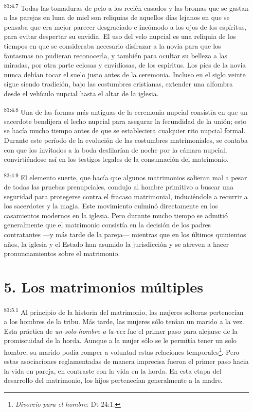 \documentclass[twoside, 11pt]{book}
\begin{document}
\par
\textsuperscript{83:4.7} Todas las tomaduras de pelo a los recién casados y las bromas que se gastan a las parejas en luna de miel son reliquias de aquellos días lejanos en que se pensaba que era mejor parecer desgraciado e incómodo a los ojos de los espíritus, para evitar despertar su envidia. El uso del velo nupcial es una reliquia de los tiempos en que se consideraba necesario disfrazar a la novia para que los fantasmas no pudieran reconocerla, y también para ocultar su belleza a las miradas, por otra parte celosas y envidiosas, de los espíritus. Los pies de la novia nunca debían tocar el suelo justo antes de la ceremonia. Incluso en el siglo veinte sigue siendo tradición, bajo las costumbres cristianas, extender una alfombra desde el vehículo nupcial hasta el altar de la iglesia.

\par
\textsuperscript{83:4.8} Una de las formas más antiguas de la ceremonia nupcial consistía en que un sacerdote bendijera el lecho nupcial para asegurar la fecundidad de la unión; esto se hacía mucho tiempo antes de que se estableciera cualquier rito nupcial formal. Durante este período de la evolución de las costumbres matrimoniales, se contaba con que los invitados a la boda desfilarían de noche por la cámara nupcial, convirtiéndose así en los testigos legales de la consumación del matrimonio.

\par
\textsuperscript{83:4.9} El elemento suerte, que hacía que algunos matrimonios salieran mal a pesar de todas las pruebas prenupciales, condujo al hombre primitivo a buscar una seguridad para protegerse contra el fracaso matrimonial, induciéndole a recurrir a los sacerdotes y la magia. Este movimiento culminó directamente en los casamientos modernos en la iglesia. Pero durante mucho tiempo se admitió generalmente que el matrimonio consistía en la decisión de los padres contratantes ---y más tarde de la pareja--- mientras que en los últimos quinientos años, la iglesia y el Estado han asumido la jurisdicción y se atreven a hacer pronunciamientos sobre el matrimonio.

\section*{5. Los matrimonios múltiples}
\par
\textsuperscript{83:5.1} Al principio de la historia del matrimonio, las mujeres solteras pertenecían a los hombres de la tribu. Más tarde, las mujeres sólo tenían un marido a la vez. Esta práctica de \textit{un-solo-hombre-a-la-vez} fue el primer paso para alejarse de la promiscuidad de la horda. Aunque a la mujer sólo se le permitía tener un solo hombre, su marido podía romper a voluntad estas relaciones temporales\footnote{\textit{Divorcio para el hombre}: Dt 24:1.}. Pero estas asociaciones reglamentadas de manera imprecisa fueron el primer paso hacia la vida en pareja, en contraste con la vida en la horda. En esta etapa del desarrollo del matrimonio, los hijos pertenecían generalmente a la madre.
\end{document}
